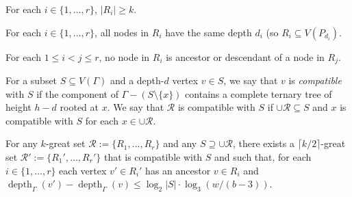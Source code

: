 \documentclass{patmorin}
\newcommand{\defin}[1]{\emph{\color{brightmaroon}#1}}
\DeclareMathOperator{\depth}{depth}
\begin{document}
\begin{compactenum}
  \item For each $i\in\{1,\ldots,r\}$, $|R_i|\ge k$.
  \item For each $i\in\{1,\ldots,r\}$, all nodes in $R_i$ have the same depth $d_i$ (so $R_i\subseteq V(P_{d_i})$.
  \item For each $1\le i<j\le r$, no node in $R_i$ is ancestor or descendant of a node in $R_j$.
\end{compactenum}

For a subset $S\subseteq V(\Gamma)$ and a depth-$d$ vertex $v\in S$, we say that $v$ is \defin{compatible} with $S$ if the component of $\Gamma-(S\setminus\{x\})$ contains a complete ternary tree of height $h-d$ rooted at $x$.  We say that $\mathcal{R}$ is compatible with $S$ if $\cup\mathcal{R}\subseteq S$ and $x$ is compatible with $S$ for each $x\in\cup\mathcal{R}$.  


\begin{lem}\label{compatible_set}
  For any $k$-great set $\mathcal{R}:=\{R_1,\ldots,R_r\}$ and any $S\supseteq \cup\mathcal{R}$, there exists a $\lceil k/2\rceil$-great set $\mathcal{R}':=\{R_1',\ldots,R_r'\}$ that is compatible with $S$ and such that, for each $i\in\{1,\ldots,r\}$ each vertex $v'\in R_i'$ has an ancestor $v\in R_i$ and $\depth_{\Gamma}(v')-\depth_{\Gamma}(v) \le \log_2|S|\cdot\log_3(w/(b-3))$.
\end{lem}
\end{document}
